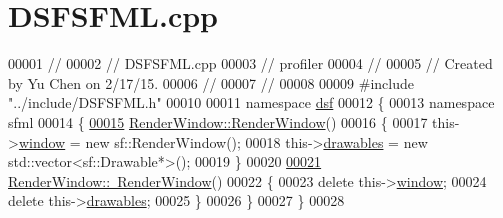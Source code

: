 \hypertarget{_d_s_f_s_f_m_l_8cpp_source}{}\section{D\+S\+F\+S\+F\+M\+L.\+cpp}
\label{_d_s_f_s_f_m_l_8cpp_source}

\begin{DoxyCode}
00001 \textcolor{comment}{//}
00002 \textcolor{comment}{//  DSFSFML.cpp}
00003 \textcolor{comment}{//  profiler}
00004 \textcolor{comment}{//}
00005 \textcolor{comment}{//  Created by Yu Chen on 2/17/15.}
00006 \textcolor{comment}{//}
00007 \textcolor{comment}{//}
00008 
00009 \textcolor{preprocessor}{#include "../include/DSFSFML.h"}
00010 
00011 \textcolor{keyword}{namespace }\hyperlink{namespacedsf}{dsf}
00012 \{
00013     \textcolor{keyword}{namespace }sfml
00014     \{
\hypertarget{_d_s_f_s_f_m_l_8cpp_source_l00015}{}\hyperlink{classdsf_1_1sfml_1_1_render_window_a86b08e1ee47f8cde51a731050be2f360}{00015}         \hyperlink{classdsf_1_1sfml_1_1_render_window_a86b08e1ee47f8cde51a731050be2f360}{RenderWindow::RenderWindow}()
00016         \{
00017             this->\hyperlink{classdsf_1_1sfml_1_1_render_window_a2c04b61ca1bfba140120001c4a9a30e1}{window} = \textcolor{keyword}{new} sf::RenderWindow();
00018             this->\hyperlink{classdsf_1_1sfml_1_1_render_window_a745350dfdb1f752359f9055d714c453d}{drawables} = \textcolor{keyword}{new} std::vector<sf::Drawable*>();
00019         \}
00020 
\hypertarget{_d_s_f_s_f_m_l_8cpp_source_l00021}{}\hyperlink{classdsf_1_1sfml_1_1_render_window_a3ef144a6351af67efcb71a647417da64}{00021}         \hyperlink{classdsf_1_1sfml_1_1_render_window_a3ef144a6351af67efcb71a647417da64}{RenderWindow::~RenderWindow}()
00022         \{
00023             \textcolor{keyword}{delete} this->\hyperlink{classdsf_1_1sfml_1_1_render_window_a2c04b61ca1bfba140120001c4a9a30e1}{window};
00024             \textcolor{keyword}{delete} this->\hyperlink{classdsf_1_1sfml_1_1_render_window_a745350dfdb1f752359f9055d714c453d}{drawables};
00025         \}
00026     \}
00027 \}
00028 
\end{DoxyCode}
